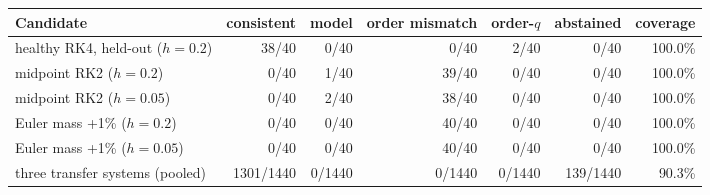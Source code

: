 \begin{tabular}{lrrrrrr}
\toprule
Candidate & consistent & model & order mismatch & order-$q$ & abstained & coverage \\
\midrule
healthy RK4, held-out ($h=0.2$) & 38/40 & 0/40 & 0/40 & 2/40 & 0/40 & 100.0\% \\
midpoint RK2 ($h=0.2$) & 0/40 & 1/40 & 39/40 & 0/40 & 0/40 & 100.0\% \\
midpoint RK2 ($h=0.05$) & 0/40 & 2/40 & 38/40 & 0/40 & 0/40 & 100.0\% \\
Euler mass +1\% ($h=0.2$) & 0/40 & 0/40 & 40/40 & 0/40 & 0/40 & 100.0\% \\
Euler mass +1\% ($h=0.05$) & 0/40 & 0/40 & 40/40 & 0/40 & 0/40 & 100.0\% \\
three transfer systems (pooled) & 1301/1440 & 0/1440 & 0/1440 & 0/1440 & 139/1440 & 90.3\% \\
\bottomrule
\end{tabular}
